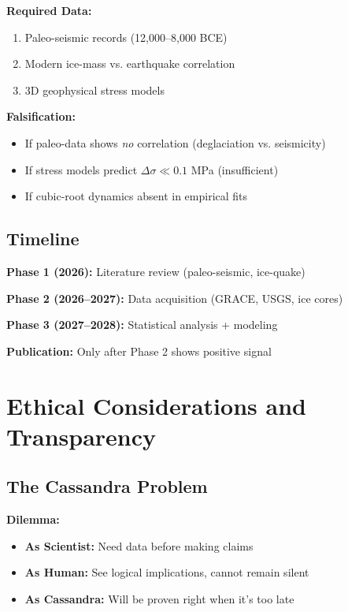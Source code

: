 \documentclass[11pt,a4paper]{article}
\begin{document}
\textbf{Required Data:}
\begin{enumerate}
\item Paleo-seismic records (12,000--8,000 BCE)
\item Modern ice-mass vs. earthquake correlation
\item 3D geophysical stress models
\end{enumerate}

\textbf{Falsification:}
\begin{itemize}
\item If paleo-data shows \textit{no} correlation (deglaciation vs. seismicity)
\item If stress models predict $\Delta \sigma \ll 0.1$ MPa (insufficient)
\item If cubic-root dynamics absent in empirical fits
\end{itemize}

\subsection{Timeline}

\textbf{Phase 1 (2026):} Literature review (paleo-seismic, ice-quake)

\textbf{Phase 2 (2026--2027):} Data acquisition (GRACE, USGS, ice cores)

\textbf{Phase 3 (2027--2028):} Statistical analysis + modeling

\textbf{Publication:} Only after Phase 2 shows positive signal

\section{Ethical Considerations and Transparency}

\subsection{The Cassandra Problem}

\textbf{Dilemma:}
\begin{itemize}
\item \textbf{As Scientist:} Need data before making claims
\item \textbf{As Human:} See logical implications, cannot remain silent
\item \textbf{As Cassandra:} Will be proven right when it's too late
\end{itemize}
\end{document}

